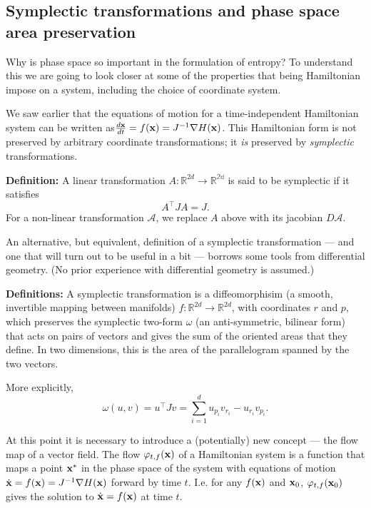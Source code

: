 \documentclass{article}
\begin{document}
\subsection*{Symplectic transformations and phase space area preservation}
Why is phase space so important in the formulation of entropy? To understand this we are going to look closer at some of the properties that being Hamiltonian impose on a system, including the choice of coordinate system.

We saw earlier that the equations of motion for a time-independent Hamiltonian system can be written as$ \frac{d{\bf x}}{dt} = f({\bf x}) = J^{-1}\nabla H({\bf x})$. This Hamiltonian form is not preserved by arbitrary coordinate transformations; it \emph{is} preserved by \emph{symplectic} transformations.

{\bf Definition:} A linear transformation $A: \mathbb{R}^{2d}\rightarrow\mathbb{R^{2d}}$ is said to be symplectic if it satisfies
$$ A^\top J A = J.$$
For a non-linear transformation $\mathcal{A}$, we replace $A$ above with its jacobian $D\mathcal{A}$.

An alternative, but equivalent, definition of a symplectic transformation --- and one that will turn out to be useful in a bit --- borrows some tools from differential geometry. (No prior experience with differential geometry is assumed.)

{\bf Definitions:} A symplectic transformation is a diffeomorphisim (a smooth, invertible mapping between manifolds) $f:\mathbb{R}^{2d}\rightarrow\mathbb{R}^{2d}$, with coordinates $r$ and $p$, which preserves the symplectic two-form $\omega$ (an anti-symmetric, bilinear form) that acts on pairs of vectors and gives the sum of the oriented areas that they define. In two dimensions, this is the area of the parallelogram spanned by the two vectors.

More explicitly,
\begin{equation*}
	\omega(u,v) = u^\top Jv = \sum_{i=1}^d u_{p_i} v_{r_i} - u_{r_i} v_{p_i}.
\end{equation*}

At this point it is necessary to introduce a (potentially) new concept --- the flow map of a vector field. The flow $\varphi_{t,f}({\bf x})$ of a Hamiltonian system is a function that maps a point ${\bf x}^*$ in the phase space of the system with equations of motion $\dot{\bf x} = f({\bf x}) =J^{-1}\nabla H({\bf x})$ forward by time $t$. I.e. for any $f({\bf x})$ and ${\bf x}_0$, $\varphi_{t,f}({\bf x}_0)$ gives the solution to $\dot{\bf x}=f({\bf x})$ at time $t$.
\end{document}
